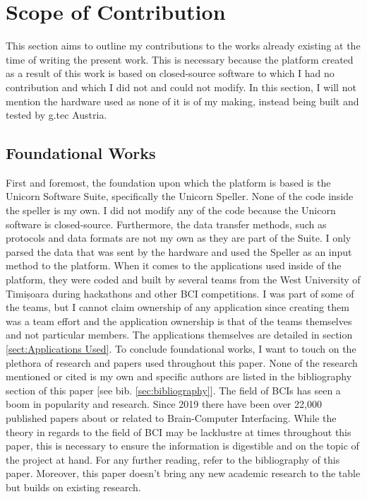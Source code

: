 \section{Scope of Contribution}\label{sect:Scope of Contribution}

This section aims to outline my contributions to the works already existing at the time of writing the present work. This is necessary because the platform created as a result of this work is based on closed-source software to which I had no contribution and which I did not and could not modify. In this section, I will not mention the hardware used as none of it is of my making, instead being built and tested by g.tec Austria.


\subsection{Foundational Works}
First and foremost, the foundation upon which the platform is based is the Unicorn Software Suite, specifically the Unicorn Speller. None of the code inside the speller is my own. I did not modify any of the code because the Unicorn software is closed-source. Furthermore, the data transfer methods, such as protocols and data formats are not my own as they are part of the Suite. I only parsed the data that was sent by the hardware and used the Speller as an input method to the platform.
\vspace{\baselineskip}\newline
When it comes to the applications used inside of the platform, they were coded and built by several teams from the West University of Timișoara during hackathons and other BCI competitions. I was part of some of the teams, but I cannot claim ownership of any application since creating them was a team effort and the application ownership is that of the teams themselves and not particular members. The applications themselves are detailed in section \ref{sect:Applications Used}.
\vspace{\baselineskip}\newline
To conclude foundational works, I want to touch on the plethora of research and papers used throughout this paper. None of the research mentioned or cited is my own and specific authors are listed in the bibliography section of this paper [see bib. \ref{sec:bibliography}]. The field of BCIs has seen a boom in popularity and research. Since 2019 there have been over 22,000 published papers about or related to Brain-Computer Interfacing\cite{bci_scholarly_articles}. While the theory in regards to the field of BCI may be lacklustre at times throughout this paper, this is necessary to ensure the information is digestible and on the topic of the project at hand. For any further reading, refer to the bibliography of this paper. Moreover, this paper doesn't bring any new academic research to the table but builds on existing research.


